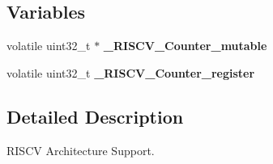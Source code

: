 \subsection*{Variables}
\begin{DoxyCompactItemize}
\item 
\mbox{\label{group__RTEMSScoreCPURISCV_ga450568de569c70ccb7b6aba75f4f7284}} 
volatile uint32\+\_\+t $\ast$ {\bfseries \+\_\+\+R\+I\+S\+C\+V\+\_\+\+Counter\+\_\+mutable}
\item 
\mbox{\label{group__RTEMSScoreCPURISCV_gaef6a48f78a5430cd0572703b30cc59bf}} 
volatile uint32\+\_\+t {\bfseries \+\_\+\+R\+I\+S\+C\+V\+\_\+\+Counter\+\_\+register}
\end{DoxyCompactItemize}


\subsection{Detailed Description}
R\+I\+S\+CV Architecture Support. 

